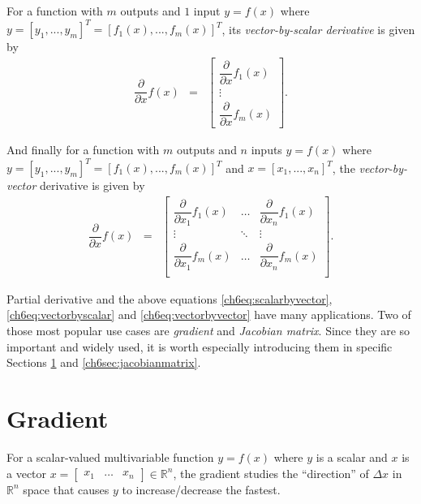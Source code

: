 For a function with $m$ outputs and $1$ input $y=f(x)$ where $y = \left[y_1,...,y_m\right]^T = \left[f_1(x),...,f_m(x)\right]^T$, its \textit{vector-by-scalar derivative} is given by
\begin{eqnarray}
	\dfrac{\partial}{\partial x}f(x) &=& \left[\begin{array}{c}
	\dfrac{\partial}{\partial x}f_1(x) \\
	\vdots \\
	\dfrac{\partial}{\partial x}f_m(x)
	\end{array}\right]. \label{ch6eq:vectorbyscalar}
\end{eqnarray}

And finally for a function with $m$ outputs and $n$ inputs $y=f(x)$ where $y = \left[y_1,...,y_m\right]^T = \left[f_1(x),...,f_m(x)\right]^T$ and $x = \left[x_1,...,x_n\right]^T$, the \textit{vector-by-vector} derivative is given by
\begin{eqnarray}
	\dfrac{\partial}{\partial x}f(x) &=& \left[\begin{array}{ccc}
	\dfrac{\partial}{\partial x_1}f_1(x) & \ldots & \dfrac{\partial}{\partial x_n}f_1(x) \\
	\vdots & \ddots & \vdots \\
	\dfrac{\partial}{\partial x_1}f_m(x) & \ldots & \dfrac{\partial}{\partial x_n}f_m(x) \\
	\end{array}\right]. \label{ch6eq:vectorbyvector}
\end{eqnarray}

Partial derivative and the above equations \eqref{ch6eq:scalarbyvector}, \eqref{ch6eq:vectorbyscalar} and \eqref{ch6eq:vectorbyvector} have many applications. Two of those most popular use cases are \textit{gradient} and \textit{Jacobian matrix}. Since they are so important and widely used, it is worth especially introducing them in specific Sections \ref{ch6sec:gradient} and \ref{ch6sec:jacobianmatrix}.

\section{Gradient} \label{ch6sec:gradient}

For a scalar-valued multivariable function $y=f(x)$ where $y$ is a scalar and $x$ is a vector $x = \left[\begin{array}{ccc}
                                                                               x_1 & \ldots & x_n
                                                                             \end{array}\right] \in \mathbb{R}^n$, the gradient studies the ``direction'' of $\Delta x$ in $\mathbb{R}^n$ space that causes $y$ to increase/decrease the fastest.

